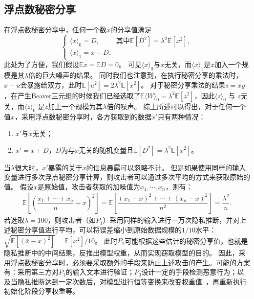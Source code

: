 \subsection{浮点数秘密分享}
在浮点数秘密分享中，任何一个数$x$的分享值满足
\begin{equation}
\begin{cases}
    \langle x \rangle_0 = D, & \text{其中} \mathbb E[D^2] = \lambda^2\mathbb E[x^2], \\
    \langle x \rangle_1 = x - D.
\end{cases}
\end{equation}
此处为了方便，我们假设$\mathbb Ex = \mathbb ED = 0$。
%
可见$\langle x \rangle_0$与$x$无关，而$\langle x \rangle_1$是$x$加入一个规模是其$\lambda$倍的巨大噪声的结果。
%
同时我们也注意到，在执行秘密分享的乘法时，$x - u$会暴露给双方，此时$\mathbb E[u^2] = 2\lambda^2 \mathbb E[x^2]$。
%
对于秘密分享乘法的结果$z = xy$，在产生Beaver三元组的时候我们已经选取了$\mathbb E \langle W \rangle_0 = \lambda^2 \mathbb E[z^2]$，因此$\langle z \rangle_0$ 与 $z$无关，而$\langle z \rangle_0$ 是$z$加上一个规模为其$\lambda$倍的噪声。
%
综上所述可以得出，对于任何一个值$x$，采用浮点数秘密分享时，各方获取到的数据$x'$只有两种情况：
\begin{enumerate}[label=(\arabic*)]
    \item $x'$与$x$无关；
    \item $x' = x + D$，$D$为与$x$无关的随机变量且$\mathbb E[D^2] = \lambda^2 \mathbb E[x^2]$。
\end{enumerate}
%
当$\lambda$很大时，$x'$暴露的关于$x$的信息暴露可以忽略不计。
%
但是如果使用同样的输入变量进行多次浮点秘密分享计算，则攻击者可以通过多次平均的方式来获取原始的值。
%
假设$x$是原始值，攻击者获取的加噪值为$x_1, \cdots, x_n$，则有：
\begin{equation}
\begin{split}
    \mathbb E\left[\left(\dfrac{x_1 + \cdots + x_n}{n} - x \right)^2 \right] = 
    \mathbb E\left[\dfrac{(x_1 - x)^2 + \cdots + (x_n - x)^2}{n^2} \right] =
    \dfrac{\lambda^2}{n}.
\end{split}
\end{equation}
%
若选取$\lambda = 100$，则攻击者（如$P_1$）采用同样的输入进行一万次隐私推断，并对上述秘密分享值进行平均，可以将误差缩小到原始数据规模的$1/10$水平：
$\sqrt{\mathbb E[(\bar x - x)^2]} = {\mathbb E[x^2]}/{10}$。
%
此时$P_1$可能根据这些估计的秘密分享值，也就是隐私推断中的中间结果，反推出模型权重，从而实现窃取模型的目的。
%
因此，采用浮点数秘密分享时，必须要采取额外的手段来防止上述攻击的产生。可能的方案有：采用第三方对$P_1$的输入文本进行验证；$P_0$设计一定的手段检测恶意行为；以及当隐私推断达到一定次数后，对模型进行恒等变换来改变权重值~\cite{xuhengyuan_2024_permutation_transformer}，再重新执行初始化阶段分享权重等。
%


